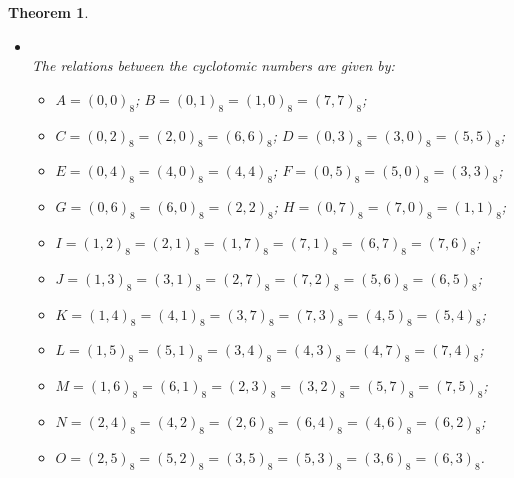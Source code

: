 \documentclass[12pt, a4paper]{article}
\newtheorem{theorem}{Theorem}[section]
\theoremstyle{definition}
\begin{document}
\begin{theorem}
\begin{itemize}
$
\begin{array}{|c|c|c|}
\hline
q \equiv 9 \mod 16 &\text{$2$ a quartic residue} &\text{$2$ not a quartic residue}\\
\hline
64A & q-15-2x & q-15-10x-8a \\
64B & q+1+2x-4a+16y & q+1+2x-4a-16b\\
64C & q+1+6x+8a-16y& q+1-2x+16y\\
64D & q+1+2x-4a-16y & q+1+2x-4a-16b\\
64E & q+1-18x & q+1+6x+24a\\
64F & q+1+2x-4a+16y & q+1+2x-4a+16b\\
64G & q+1+6x+8a+16y & q+1-2x-16y\\
64H & q+1+2x-4a-16y & q+1+2x-4a+16b\\
64I & q-7+2x+4a & q-7+2x+4a+16y\\
64J & q-7+2x+4a & q-7+2x+4a-16y\\
64K & q+1-6x+4a+16b & q+1+2x-4a\\
64L & q+1+2x-4a & q+1-6x+4a\\
64M & q+1-6x+4a-16b & q+1+2x-4a\\
64N & q-7-2x-8a & q-7+6x\\
64O & q+1+2x-4a & q+1-6x+4a\\
\hline
\end{array}
$

\item[]\\
The relations between the cyclotomic numbers are given by:
\begin{itemize}
\item[]$A=(0,0)_8$; $B=(0,1)_8 =(1,0)_8 =(7,7)_8$;
\item[]$C=(0,2)_8 =(2,0)_8 =(6,6)_8$; $D=(0,3)_8 =(3,0)_8 =(5,5)_8$; 
\item[]$E=(0,4)_8=(4,0)_8=(4,4)_8$; $F=(0,5)_8 =(5,0)_8 =(3,3)_8$; 
\item[]$G=(0,6)_8 =(6,0)_8 =(2,2)_8$; $H=(0,7)_8 =(7,0)_8 =(1,1)_8$;
\item[]$I=(1,2)_8 =(2,1)_8 =(1,7)_8 =(7,1)_8 =(6,7)_8 =(7,6)_8$;
\item[]$J=(1,3)_8 =(3,1)_8 =(2,7)_8 =(7,2)_8 =(5,6)_8 =(6,5)_8$;
\item[]$K=(1,4)_8 =(4,1)_8 =(3,7)_8 =(7,3)_8 =(4,5)_8 =(5,4)_8$;
\item[]$L=(1,5)_8 =(5,1)_8 =(3,4)_8 =(4,3)_8 =(4,7)_8 =(7,4)_8$;
\item[]$M=(1,6)_8 =(6,1)_8 =(2,3)_8 =(3,2)_8 =(5,7)_8 =(7,5)_8$;
\item[]$N=(2,4)_8 =(4,2)_8 =(2,6)_8 =(6,4)_8 =(4,6)_8 =(6,2)_8$;
\item[]$O=(2,5)_8 =(5,2)_8 =(3,5)_8 =(5,3)_8 =(3,6)_8 =(6,3)_8$.
\end{itemize}


\end{itemize}
\end{theorem}
\end{document}
